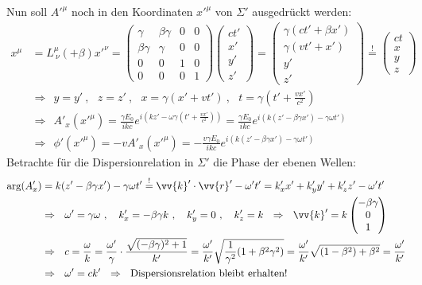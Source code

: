 \documentclass[a4paper,12pt]{article}
\begin{document}
Nun soll $A'^\mu$ noch in den Koordinaten $x'^\mu$ von $\Sigma'$ ausgedrückt werden:
\begin{align*}
x^\mu&=L^\mu_{\ \nu}(+\beta)x'^\nu=\begin{pmatrix}
\gamma & \beta\gamma &0&0\\
\beta\gamma &\gamma &0&0\\
0&0&1&0\\
0&0&0&1
\end{pmatrix}\begin{pmatrix}
ct'\\ x'\\y'\\z'
\end{pmatrix}=\begin{pmatrix}
\gamma (ct'+\beta x')\\\gamma (vt'+x')\\y'\\z'
\end{pmatrix}\overset{!}{=}\begin{pmatrix}
ct\\x\\y\\z
\end{pmatrix}\\
&\Rightarrow\ \ y=y'\ ,\ \ \ z=z'\ ,\ \ \ x=\gamma (x'+vt')\ ,\ \ \ t=\gamma (t'+\frac{vx'}{c^2})\\
&\Rightarrow\ \ A'_x(x'^\mu)=\frac{\gamma E_0}{ikc}e^{i(kz'-\omega\gamma (t'+\frac{vx'}{c^2}))}=\frac{\gamma E_0}{ikc}e^{i(k(z'-\beta\gamma x')-\gamma\omega t')}\\
&\Rightarrow\ \ \phi'(x'^\mu)=-vA'_x(x'^\mu)=-\frac{v\gamma E_0}{ikc}e^{i(k(z'-\beta\gamma x')-\gamma\omega t')}
\end{align*}
Betrachte für die Dispersionrelation in $\Sigma'$ die Phase der ebenen Wellen:
\begin{align*}
\textrm{arg}(A'_x)&=k(z'-\beta\gamma x')-\gamma\omega t'\overset{!}{=}\vv{k}'\cdot\vv{r}'-\omega' t'=k'_xx'+k'_yy'+k'_zz'-\omega' t'\\
&\Rightarrow\ \ \omega'=\gamma\omega\ ,\ \ \ k'_x=-\beta\gamma k\ ,\ \ \ k'_y=0\ ,\ \ \ k'_z=k\ \ \Rightarrow\ \ \vv{k}'=k\begin{pmatrix}
-\beta\gamma\\0\\1
\end{pmatrix}\\
&\Rightarrow\ \ c=\frac{\omega}{k}=\frac{\omega'}{\gamma}\cdot\frac{\sqrt{(-\beta\gamma)^2+1}}{k'}=\frac{\omega'}{k'}\sqrt{\frac{1}{\gamma^2}(1+\beta^2\gamma^2)}=\frac{\omega'}{k'}\sqrt{(1-\beta^2)+\beta^2}=\frac{\omega'}{k'}\\
&\Rightarrow\ \ \omega'=ck'\ \ \Rightarrow\ \ \textrm{Dispersionsrelation bleibt erhalten!}
\end{align*}
\end{document}
